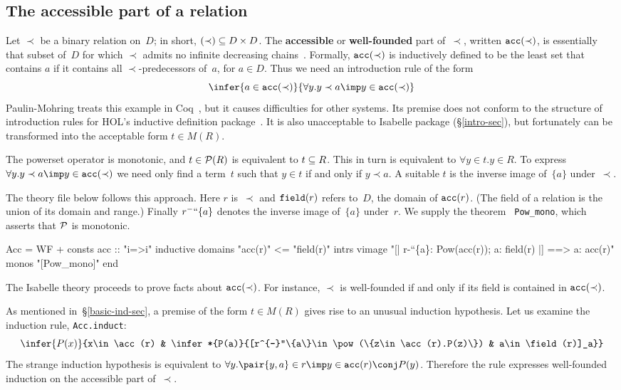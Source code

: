 \subsection{The accessible part of a relation}\label{acc-sec}
Let $\prec$ be a binary relation on~$D$; in short, $(\prec)\subseteq D\times D$.
The {\bf accessible} or {\bf well-founded} part of~$\prec$, written
$\hbox{\tt acc}(\prec)$, is essentially that subset of~$D$ for which $\prec$ admits
no infinite decreasing chains~\cite{aczel77}.  Formally, $\hbox{\tt acc}(\prec)$ is
inductively defined to be the least set that contains $a$ if it contains
all $\prec$-predecessors of~$a$, for $a\in D$.  Thus we need an
introduction rule of the form 
\[ \infer{a\in\acc(\prec)}{\forall y.y\prec a\imp y\in\acc(\prec)} \]
Paulin-Mohring treats this example in Coq~\cite{paulin92}, but it causes
difficulties for other systems.  Its premise does not conform to 
the structure of introduction rules for HOL's inductive definition
package~\cite{camilleri92}.  It is also unacceptable to Isabelle package
(\S\ref{intro-sec}), but fortunately can be transformed into the acceptable
form $t\in M(R)$.

The powerset operator is monotonic, and $t\in{\cal P}(R)$ is equivalent to
$t\subseteq R$.  This in turn is equivalent to $\forall y\in t. y\in R$.  To
express $\forall y.y\prec a\imp y\in\acc(\prec)$ we need only find a
term~$t$ such that $y\in t$ if and only if $y\prec a$.  A suitable $t$ is
the inverse image of~$\{a\}$ under~$\prec$.

The theory file below follows this approach.  Here $r$ is~$\prec$ and
$\hbox{\tt field}(r)$ refers to~$D$, the domain of $\hbox{\tt acc}(r)$.  (The field of a
relation is the union of its domain and range.)  Finally $r^{-}``\{a\}$
denotes the inverse image of~$\{a\}$ under~$r$.  We supply the theorem {\tt
  Pow\_mono}, which asserts that ${\cal P}$ is monotonic.
\begin{ttbox}
Acc = WF + 
consts    acc :: "i=>i"
inductive
  domains "acc(r)" <= "field(r)"
  intrs
    vimage  "[| r-``\{a\}: Pow(acc(r)); a: field(r) |] ==> a: acc(r)"
  monos     "[Pow_mono]"
end
\end{ttbox}
The Isabelle theory proceeds to prove facts about $\hbox{\tt acc}(\prec)$.  For
instance, $\prec$ is well-founded if and only if its field is contained in
$\hbox{\tt acc}(\prec)$.  

As mentioned in~\S\ref{basic-ind-sec}, a premise of the form $t\in M(R)$
gives rise to an unusual induction hypothesis.  Let us examine the
induction rule, {\tt Acc.induct}:
\[ \infer{P(x)}{x\in\acc(r) &
     \infer*{P(a)}{[r^{-}``\{a\}\in\pow(\{z\in\acc(r).P(z)\}) & 
                   a\in\field(r)]_a}}
\]
The strange induction hypothesis is equivalent to
$\forall y. \pair{y,a}\in r\imp y\in\acc(r)\conj P(y)$.
Therefore the rule expresses well-founded induction on the accessible part
of~$\prec$.

